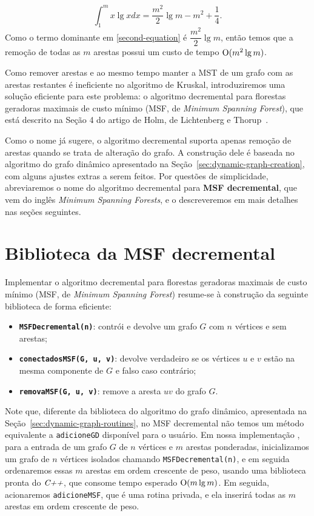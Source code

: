 \begin{equation}
    \int_{1}^{m} x \lg x dx = \dfrac{m^2}{2}\lg m - m^2 + \dfrac{1}{4}.
    \label{second-equation}
\end{equation}
Como o termo dominante em \ref{second-equation} é $\dfrac{m^2}{2}\lg m$, então temos que a remoção de todas as $m$ arestas possui um custo de tempo $\mathrm{O}(m^2 \lg m)$. 

Como remover arestas e ao mesmo tempo manter a MST de um grafo com as arestas restantes é ineficiente no algoritmo de Kruskal, introduziremos uma solução eficiente para este problema: o algoritmo decremental para florestas geradoras maximais de custo mínimo (MSF, de \textit{Minimum Spanning Forest}), que está descrito na Seção 4 do artigo de Holm, de Lichtenberg e Thorup~\cite{jacob_holm}.

Como o nome já sugere, o algoritmo decremental suporta apenas remoção de arestas quando se trata de alteração do grafo. A construção dele é baseada no algoritmo do grafo dinâmico apresentado na Seção~\ref{sec:dynamic-graph-creation}, com alguns ajustes extras a serem feitos. Por questões de simplicidade, abreviaremos o nome do algoritmo decremental para \textbf{MSF decremental}, que vem do inglês \textit{Minimum Spanning Forests}, e o descreveremos em mais detalhes nas seções seguintes.

\section{Biblioteca da MSF decremental}
\label{sec:decremental-msf-library}

Implementar o algoritmo decremental para florestas geradoras maximais de custo mínimo (MSF, de \textit{Minimum Spanning Forest}) resume-se à construção da seguinte biblioteca de forma eficiente:

\begin{itemize}
    \item \texttt{\textbf{MSFDecremental(n)}}: contrói e devolve um grafo $G$ com $n$ vértices e sem arestas;
    \item \texttt{\textbf{conectadosMSF(G, u, v)}}: devolve verdadeiro se os vértices $u$ e $v$ estão na mesma componente de $G$ e falso caso contrário;
    \item \texttt{\textbf{removaMSF(G, u, v)}}: remove a aresta $uv$ do grafo $G$.
\end{itemize} 

Note que, diferente da biblioteca do algoritmo do grafo dinâmico, apresentada na Seção~\ref{sec:dynamic-graph-routines}, no MSF decremental não temos um método equivalente a \texttt{adicioneGD} disponível para o usuário. Em nossa implementação \cite{chung2025}, para a entrada de um grafo $G$ de $n$ vértices e $m$ arestas ponderadas, inicializamos um grafo de $n$ vértices isolados chamando \texttt{MSFDecremental(n)}, e em seguida ordenaremos essas $m$ arestas em ordem crescente de peso, usando uma biblioteca pronta do $\emph{C++}$, que consome tempo esperado $\mathrm{O}(m \lg m)$. Em seguida, acionaremos \texttt{adicioneMSF}, que é uma rotina privada, e ela inserirá todas as $m$ arestas em ordem crescente de peso. 

